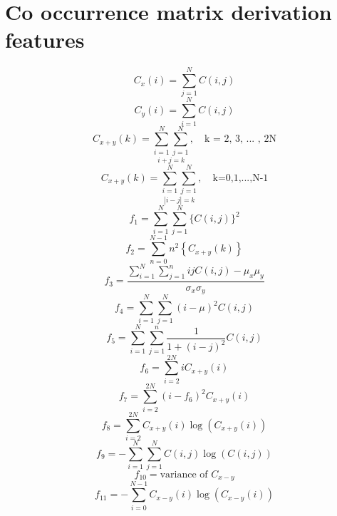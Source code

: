 \chapter{Co occurrence matrix derivation features}
\label{derivationfeatures}
\[
C_x(i) = \sum_{j=1}^{N}C(i,j)
\]
\[
C_y(i) = \sum_{i=1}^{N}C(i,j)
\]
\[
C_{x+y}(k) = \underset{i+j=k}{\sum_{i=1}^{N}\sum_{j=1}^{N}}, \quad \text{k = 2, 3, ... , 2N}
\]
\[
C_{x+y}(k) = \underset{|i-j|=k}{\sum_{i=1}^{N}\sum_{j=1}^{N}}, \quad \text{k=0,1,...,N-1}
\]
\begin{equation}\label{AngularSecondMoment}
  f_1 = \sum_{i=1}^{N}\sum_{j=1}^{N}\{C(i,j)\}^2
\end{equation}
\begin{equation}\label{Contrast}
  f_2 = \sum_{n=0}^{N-1} n^2 \left\{C_{x+y}(k)\right\}
\end{equation}
\begin{equation}\label{Correlation}
  f_3 = \frac{\sum_{i=1}^{N}\sum_{j=1}^{n} i j C(i,j) - \mu_x \mu_y}{\sigma_x\sigma_y}
\end{equation}
\begin{equation}\label{Variance}
  f_4 = \sum_{i=1}^{N}\sum_{j=1}^{N}(i-\mu)^2 C(i,j)
\end{equation}
\begin{equation}\label{InverseDifferenceMoment}
  f_5 = \sum_{i=1}^{N}\sum_{j=1}^{n} \frac{1}{1+(i-j)^2} C(i,j)
\end{equation}
\begin{equation}\label{SumAverage}
  f_6 = \sum_{i=2}^{2N} i C_{x+y}(i)
\end{equation}
\begin{equation}\label{SumVariance}
  f_7 = \sum_{i=2}^{2N} (i - f_6)^2 C_{x+y}(i)
\end{equation}
\begin{equation}\label{SumEntropy}
  f_8 = \sum_{i=2}^{2N}C_{x+y}(i) \log(C_{x+y}(i))
\end{equation}
\begin{equation}\label{Entropy}
  f_9 = -\sum_{i=1}^{N}\sum_{j=1}^{N} C(i,j) \log(C(i,j))
\end{equation}
\begin{equation}\label{DifferenceVariance}
  f_{10} = \text{variance of }C_{x-y}
\end{equation}
\begin{equation}\label{DifferenceEntropy}
  f_{11} = -\sum_{i=0}^{N-1} C_{x-y}(i) \log(C_{x-y}(i))
\end{equation}